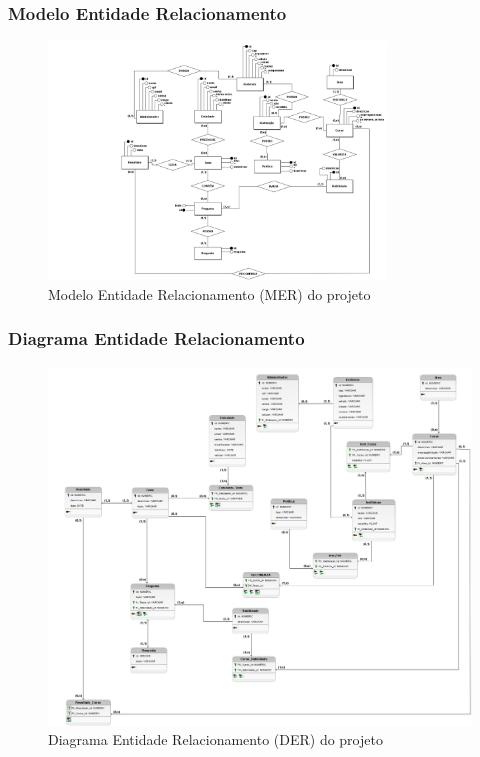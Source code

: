 \subsubsection{Modelo Entidade Relacionamento}
\begin{figure}[ht]
        \centering
\includegraphics[width=0.8\textwidth]{mer.png}
        \caption{Modelo Entidade Relacionamento (MER) do projeto}
        \label{fig:enter-label}
    \end{figure}
    
\subsubsection{Diagrama Entidade Relacionamento}
\begin{figure}[ht]
        \centering
        \includegraphics[width=1.0\textwidth]{modeloLogico.png}
        \caption{Diagrama Entidade Relacionamento (DER) do projeto}
        \label{fig:enter-label}
    \end{figure}


